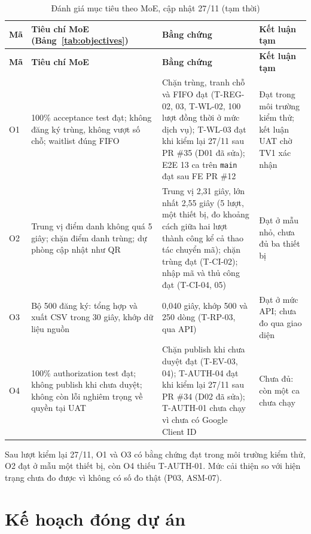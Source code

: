 \begingroup\tblsetup\tblzebra
\begin{longtable}{L{1.0cm}L{4.4cm}L{5.0cm}L{2.6cm}}
\caption{Đánh giá mục tiêu theo MoE, cập nhật 27/11 (tạm thời)}\label{tab:moe-eval}\\
\toprule
{}\textbf{Mã} & \textbf{Tiêu chí MoE (Bảng~\ref{tab:objectives})} & \textbf{Bằng chứng} & \textbf{Kết luận tạm} \\
\midrule
\endfirsthead
\toprule
{}\textbf{Mã} & \textbf{Tiêu chí MoE} & \textbf{Bằng chứng} & \textbf{Kết luận tạm} \\
\midrule
\endhead
\bottomrule
\endlastfoot
O1 & 100\% acceptance test đạt; không đăng ký trùng, không vượt số chỗ; waitlist đúng FIFO & Chặn trùng, tranh chỗ và FIFO đạt (T-REG-02, 03, T-WL-02, 100 lượt đồng thời ở mức dịch vụ); T-WL-03 đạt khi kiểm lại 27/11 sau PR \#35 (D01 đã sửa); E2E 13 ca trên \texttt{main} đạt sau FE PR \#12 & Đạt trong môi trường kiểm thử; kết luận UAT chờ TV1 xác nhận \\
O2 & Trung vị điểm danh không quá 5 giây; chặn điểm danh trùng; dự phòng cập nhật như QR & Trung vị 2,31 giây, lớn nhất 2,55 giây (5 lượt, một thiết bị, đo khoảng cách giữa hai lượt thành công kể cả thao tác chuyển mã); chặn trùng đạt (T-CI-02); nhập mã và thủ công đạt (T-CI-04, 05) & Đạt ở mẫu nhỏ, chưa đủ ba thiết bị \\
O3 & Bộ 500 đăng ký: tổng hợp và xuất CSV trong 30 giây, khớp dữ liệu nguồn & 0,040 giây, khớp 500 và 250 dòng (T-RP-03, qua API) & Đạt ở mức API; chưa đo qua giao diện \\
O4 & 100\% authorization test đạt; không publish khi chưa duyệt; không còn lỗi nghiêm trọng về quyền tại UAT & Chặn publish khi chưa duyệt đạt (T-EV-03, 04); T-AUTH-04 đạt khi kiểm lại 27/11 sau PR \#34 (D02 đã sửa); T-AUTH-01 chưa chạy vì chưa có Google Client ID & Chưa đủ: còn một ca chưa chạy \\
\end{longtable}
\endgroup

Sau lượt kiểm lại 27/11, O1 và O3 có bằng chứng đạt trong môi trường kiểm thử, O2 đạt ở mẫu một thiết bị, còn O4 thiếu T-AUTH-01. Mức cải thiện so với hiện trạng chưa đo được vì không có số đo thật (P03, ASM-07).


\section{Kế hoạch đóng dự án}
\label{sec:4-4}

